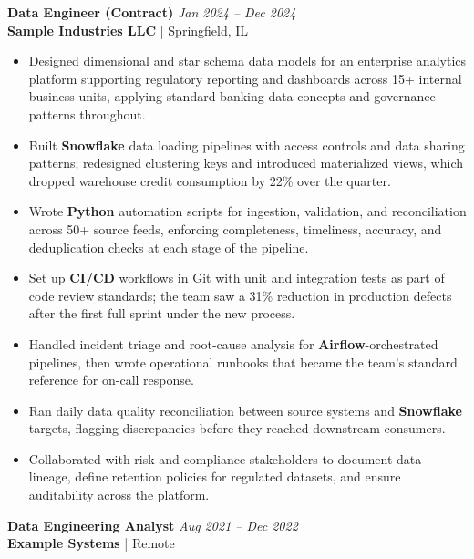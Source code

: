 \documentclass[\rFontPt pt,letterpaper]{extarticle}
\newcommand{\rEntryGap}{7.37pt}
\newcommand{\rEntryHead}[1]{\needspace{#1\baselineskip}}
\begin{document}
\vspace{\rEntryGap}
\rEntryHead{4}
\textbf{Data Engineer (Contract)} \hfill \textit{Jan 2024 -- Dec 2024}\\
\textbf{Sample Industries LLC} | Springfield, IL
\vspace{0pt}
\begin{itemize}
\item Designed dimensional and star schema data models for an enterprise analytics platform supporting regulatory reporting and dashboards across 15+ internal business units, applying standard banking data concepts and governance patterns throughout.
\item Built \textbf{\mbox{Snowflake}} data loading pipelines with access controls and data sharing patterns; redesigned clustering keys and introduced materialized views, which dropped warehouse credit consumption by 22\% over the quarter.
\item Wrote \textbf{\mbox{Python}} automation scripts for ingestion, validation, and reconciliation across 50+ source feeds, enforcing completeness, timeliness, accuracy, and deduplication checks at each stage of the pipeline.
\item Set up \textbf{\mbox{CI/CD}} workflows in \mbox{Git} with unit and integration tests as part of code review standards; the team saw a 31\% reduction in production defects after the first full sprint under the new process.
\item Handled incident triage and root-cause analysis for \textbf{\mbox{Airflow}}-orchestrated pipelines, then wrote operational runbooks that became the team's standard reference for on-call response.
\item Ran daily data quality reconciliation between source systems and \textbf{\mbox{Snowflake}} targets, flagging discrepancies before they reached downstream consumers.
\item Collaborated with risk and compliance stakeholders to document data lineage, define retention policies for regulated datasets, and ensure auditability across the platform.
\end{itemize}
\vspace{\rEntryGap}
\rEntryHead{4}
\textbf{Data Engineering Analyst} \hfill \textit{Aug 2021 -- Dec 2022}\\
\textbf{Example Systems} | Remote
\vspace{0pt}
\end{document}
